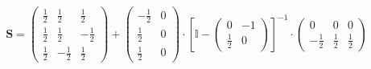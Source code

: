 \documentclass[10pt]{article} \usepackage{amsmath} \usepackage{bbold}
\begin{document}
\[ \mathbf{S} = \left(\begin{smallmatrix} \frac{1}{2} & \frac{1}{2} &
\frac{1}{2} \\ \frac{1}{2} & \frac{1}{2} & -\frac{1}{2} \\ \frac{1}{2}
& -\frac{1}{2} & \frac{1}{2} \end{smallmatrix}\right) +
\left(\begin{smallmatrix} -\frac{1}{2} & 0 \\ \frac{1}{2} & 0 \\
\frac{1}{2} & 0 \end{smallmatrix}\right) \cdot \left[ \mathbb{I}  -
\left(\begin{smallmatrix} 0 & -1 \\ \frac{1}{2} & 0
\end{smallmatrix}\right) \right]^{-1} \cdot\left(\begin{smallmatrix} 0
& 0 & 0 \\ -\frac{1}{2} & \frac{1}{2} & \frac{1}{2}
\end{smallmatrix}\right) \]
\end{document}
